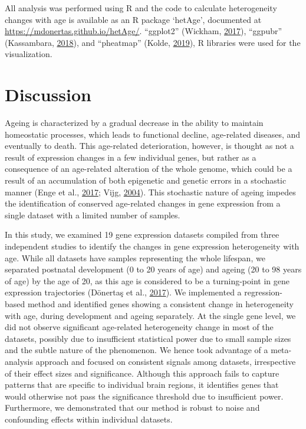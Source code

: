 \documentclass[12pt,twoside]{unicam}
\begin{document}
All analysis was performed using R and the code to calculate heterogeneity changes with age is available as an R package `hetAge', documented at \url{https://mdonertas.github.io/hetAge/}. ``ggplot2'' (Wickham, \protect\hyperlink{ref-Wickham2017}{2017}), ``ggpubr'' (Kassambara, \protect\hyperlink{ref-Kassambara2018}{2018}), and ``pheatmap'' (Kolde, \protect\hyperlink{ref-Kolde2019}{2019}), R libraries were used for the visualization.

\hypertarget{discussion}{%
\section{Discussion}\label{discussion}}

Ageing is characterized by a gradual decrease in the ability to maintain homeostatic processes, which leads to functional decline, age-related diseases, and eventually to death. This age-related deterioration, however, is thought as not a result of expression changes in a few individual genes, but rather as a consequence of an age-related alteration of the whole genome, which could be a result of an accumulation of both epigenetic and genetic errors in a stochastic manner (Enge et al., \protect\hyperlink{ref-Enge2017}{2017}; Vijg, \protect\hyperlink{ref-Vijg2004}{2004}). This stochastic nature of ageing impedes the identification of conserved age-related changes in gene expression from a single dataset with a limited number of samples.

In this study, we examined 19 gene expression datasets compiled from three independent studies to identify the changes in gene expression heterogeneity with age. While all datasets have samples representing the whole lifespan, we separated postnatal development (0 to 20 years of age) and ageing (20 to 98 years of age) by the age of 20, as this age is considered to be a turning-point in gene expression trajectories (Dönertaş et al., \protect\hyperlink{ref-Donertas2017}{2017}). We implemented a regression-based method and identified genes showing a consistent change in heterogeneity with age, during development and ageing separately. At the single gene level, we did not observe significant age-related heterogeneity change in most of the datasets, possibly due to insufficient statistical power due to small sample sizes and the subtle nature of the phenomenon. We hence took advantage of a meta-analysis approach and focused on consistent signals among datasets, irrespective of their effect sizes and significance. Although this approach fails to capture patterns that are specific to individual brain regions, it identifies genes that would otherwise not pass the significance threshold due to insufficient power. Furthermore, we demonstrated that our method is robust to noise and confounding effects within individual datasets.
\end{document}
